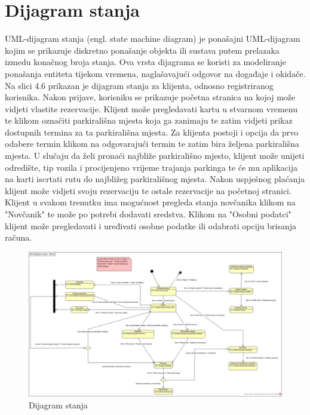 \eject

\section{Dijagram stanja}

UML-dijagram stanja (engl. state machine diagram) je ponašajni UML-dijagram kojim se prikazuje
diskretno ponašanje objekta ili sustava putem prelazaka izmedu konačnog broja stanja.
Ova vrsta dijagrama se koristi za modeliranje ponašanja entiteta tijekom vremena, naglašavajući
odgovor na događaje i okidače. Na slici 4.6 prikazan je dijagram stanja za klijenta, odnosno registriranog korisnika. Nakon prijave, korisniku se prikazuje početna stranica na kojoj može vidjeti vlastite rezervacije. Klijent može pregledavati kartu u stvarnom vremenu te klikom označiti parkirališna mjesta koja ga zanimaju te zatim vidjeti prikaz dostupnih termina za ta parkirališna mjesta. Za klijenta postoji i opcija da prvo odabere termin klikom na odgovarajući termin te zatim bira željena parkirališna mjesta. U slučaju da želi pronaći najbliže parkirališno mjesto, klijent može unijeti odredište, tip vozila i procijenjeno vrijeme trajanja parkinga te će mu aplikacija na karti iscrtati rutu do najbližeg parkirališnog mjesta. Nakon uspješnog plaćanja klijent može vidjeti svoju rezervaciju te ostale rezervacije na početnoj stranici. Klijent u svakom trenutku ima mogućnost pregleda stanja novčanika klikom na "Novčanik" te može po potrebi dodavati sredstva. Klikom na "Osobni podatci" klijent može pregledavati i uređivati osobne podatke ili odabrati opciju brisanja računa.

\begin{figure}[H]
	\includegraphics[width=\textwidth]{slike/dijagram_stanja.jpg} %
	\centering
	\caption{Dijagram stanja}
	\label{fig:dijagramstanja}
\end{figure}


